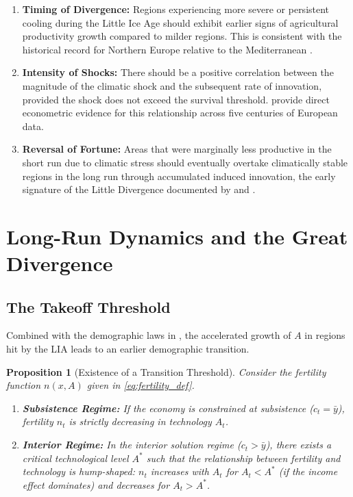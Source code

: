 \documentclass[11pt,a4paper]{article}
\newtheorem{prop}{Proposition}
\begin{document}
\begin{enumerate}
  \item \textbf{Timing of Divergence:} Regions experiencing more severe or persistent cooling during the Little Ice Age should exhibit earlier signs of agricultural productivity growth compared to milder regions. This is consistent with the historical record for Northern Europe relative to the Mediterranean \parencite{OlssonSvensson2010, MartinezGonzalez2020}.
  \item \textbf{Intensity of Shocks:} There should be a positive correlation between the magnitude of the climatic shock and the subsequent rate of innovation, provided the shock does not exceed the survival threshold. \textcite{DeDreu2018} provide direct econometric evidence for this relationship across five centuries of European data.
  \item \textbf{Reversal of Fortune:} Areas that were marginally less productive in the short run due to climatic stress should eventually overtake climatically stable regions in the long run through accumulated induced innovation, the early signature of the Little Divergence documented by \textcite{Pfister2022} and \textcite{Allen2003}.
\end{enumerate}

\section{Long-Run Dynamics and the Great Divergence}
\label{sec:long_run}

\subsection*{The Takeoff Threshold}

Combined with the demographic laws in , the accelerated growth of \(A\) in regions hit by the LIA leads to an earlier demographic transition.

\begin{prop}[Existence of a Transition Threshold]
  \label{prop:transition}
  Consider the fertility function \(n(x, A)\) given in \eqref{eq:fertility_def}.
  \begin{enumerate}
    \item \textbf{Subsistence Regime:} If the economy is constrained at subsistence (\(c_t = \bar{y}\)), fertility \(n_t\) is strictly decreasing in technology \(A_t\).
    \item \textbf{Interior Regime:} In the interior solution regime (\(c_t > \bar{y}\)), there exists a critical technological level \(A^*\) such that the relationship between fertility and technology is hump-shaped: \(n_t\) increases with \(A_t\) for \(A_t < A^*\) (if the income effect dominates) and decreases for \(A_t > A^*\).
  \end{enumerate}
\end{prop}
\end{document}
